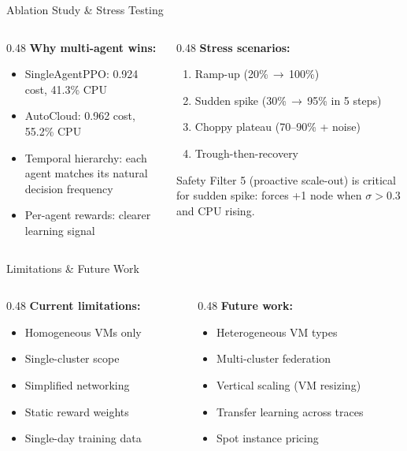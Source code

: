 \documentclass[aspectratio=169,11pt]{beamer}
\begin{document}
\begin{frame}{Ablation Study \& Stress Testing}
\begin{columns}[T]
\begin{column}{0.48\textwidth}
\textbf{Why multi-agent wins:}
\begin{itemize}
  \item SingleAgentPPO: 0.924 cost, 41.3\% CPU
  \item AutoCloud: 0.962 cost, 55.2\% CPU
  \item Temporal hierarchy: each agent matches its natural decision frequency
  \item Per-agent rewards: clearer learning signal
\end{itemize}
\end{column}
\begin{column}{0.48\textwidth}
\textbf{Stress scenarios:}
\begin{enumerate}
  \item Ramp-up (20\%\,$\to$\,100\%)
  \item Sudden spike (30\%\,$\to$\,95\% in 5 steps)
  \item Choppy plateau (70--90\% + noise)
  \item Trough-then-recovery
\end{enumerate}
\vspace{0.2cm}
Safety Filter 5 (proactive scale-out) is critical for sudden spike: forces +1 node when $\sigma > 0.3$ and CPU rising.
\end{column}
\end{columns}
\end{frame}

\begin{frame}{Limitations \& Future Work}
\begin{columns}[T]
\begin{column}{0.48\textwidth}
\textbf{Current limitations:}
\begin{itemize}
  \item Homogeneous VMs only
  \item Single-cluster scope
  \item Simplified networking
  \item Static reward weights
  \item Single-day training data
\end{itemize}
\end{column}
\begin{column}{0.48\textwidth}
\textbf{Future work:}
\begin{itemize}
  \item Heterogeneous VM types
  \item Multi-cluster federation
  \item Vertical scaling (VM resizing)
  \item Transfer learning across traces
  \item Spot instance pricing
\end{itemize}
\end{column}
\end{columns}
\end{frame}
\end{document}
